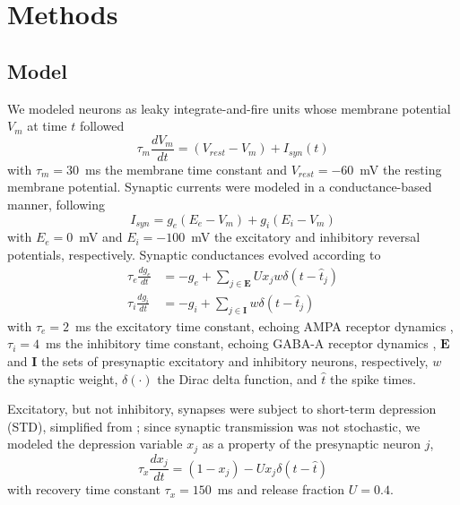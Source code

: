 \documentclass[9pt,lineno,onehalfspacing]{elife}
\begin{document}
\section{Methods}\label{sec:methods}

\subsection{Model}\label{sec:model}

We modeled neurons as leaky integrate-and-fire units whose membrane potential $V_m$ at time $t$ followed
\begin{equation}
    \tau_m \frac{dV_m}{dt} = (V_{rest}-V_m) + I_{syn}(t)
\end{equation}
with $\tau_m = 30$~ms the membrane time constant and $V_{rest} = -60$~mV the resting membrane potential. Synaptic currents were modeled in a conductance-based manner, following
\begin{equation}
    I_{syn} = g_e(E_e-V_m) + g_i(E_i-V_m)
\end{equation}
with $E_e = 0$~mV and $E_i = -100$~mV the excitatory and inhibitory reversal potentials, respectively. Synaptic conductances evolved according to
\begin{align} 
    \tau_e \frac{dg_e}{dt} &= -g_e + \sum_{j \in \boldsymbol E} U x_j w \delta(t - \hat{t}_j) \nonumber \\
    \tau_i \frac{dg_i}{dt} &= -g_i + \sum_{j \in \boldsymbol I} w \delta(t - \hat{t}_j) \label{eq:gsyn}
\end{align}
with $\tau_e = 2$~ms the excitatory time constant, echoing AMPA receptor dynamics \citep{Hausser1997-cn}, $\tau_i = 4$~ms the inhibitory time constant, echoing GABA-A receptor dynamics \citep{Destexhe1994-oc}, $\boldsymbol E$ and $\boldsymbol I$ the sets of presynaptic excitatory and inhibitory neurons, respectively, $w$ the synaptic weight, $\delta(\cdot)$ the Dirac delta function, and $\hat{t}$ the spike times.

Excitatory, but not inhibitory, synapses were subject to short-term depression (STD), simplified from \cite{Tsodyks1997-qt}; since synaptic transmission was not stochastic, we modeled the depression variable $x_j$ as a property of the presynaptic neuron $j$,
\begin{equation}
    \tau_x \frac{dx_j}{dt} = (1-x_j) - U x_j \delta(t - \hat{t}) \label{eq:xsyn}
\end{equation}
with recovery time constant $\tau_x = 150$~ms and release fraction $U = 0.4$.
\end{document}
